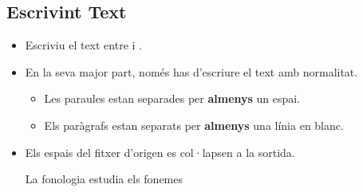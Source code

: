 \subsection{Escrivint Text}
\begin{frame}[fragile]{\insertsubsection{}}
\small
\begin{itemize}
\item Escriviu el text entre  i .
\item En la seva major part, només has d'escriure el text amb normalitat.

\begin{itemize}
    \item Les paraules estan separades per \textbf{almenys} un espai.
    \item Els paràgrafs estan separats per \textbf{almenys} una línia en blanc.
\end{itemize}

\item Els espais del fitxer d'origen es col·lapsen a la sortida. 
\begin{exampletwouptiny}
La          fonologia
    estudia els fonemes 
\end{exampletwouptiny}
\end{itemize}
\end{frame}


